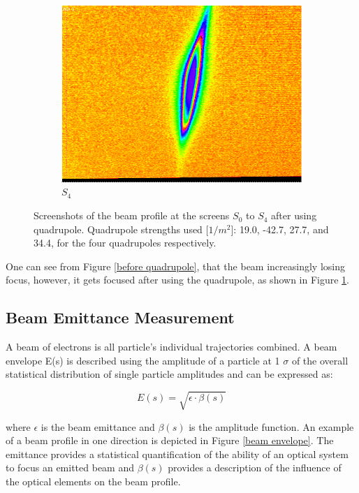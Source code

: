 \documentclass[12pt]{article}
\begin{document}
\begin{figure}[H]
\begin{subfigure}{0.16\textwidth}
    \includegraphics[width=\linewidth]{fig/S4w.png}
    \caption{$S_4$}
  \end{subfigure}
  
  \caption{Screenshots of the beam profile at the screens $S_0$ to $S_4$ after using quadrupole. Quadrupole strengths used [$1/m^2$]: 19.0, -42.7, 27.7, and 34.4, for the four quadrupoles respectively.}
  \label{after quadrupole}
\end{figure}

One can see from Figure \ref{before quadrupole}, that the beam increasingly losing focus, however, it gets focused after using the quadrupole, as shown in Figure \ref{after quadrupole}. 

\subsection{Beam Emittance Measurement}
A beam of electrons is all particle's individual trajectories combined. A beam envelope E(s) is described using the amplitude of a particle at 1 $\sigma$ of the overall  statistical distribution of single particle amplitudes and can be expressed as:

\begin{equation}
    E(s) = \sqrt{\epsilon \cdot \beta(s)}
\end{equation}

where $\epsilon$ is the beam emittance and $\beta(s)$ is the amplitude function. An example of a beam profile in one direction is depicted in Figure \ref{beam envelope}. The emittance provides a statistical quantification of the ability of an optical system to focus an emitted beam and $\beta(s)$ provides a description of the influence of the optical elements on the beam profile.
\end{document}
